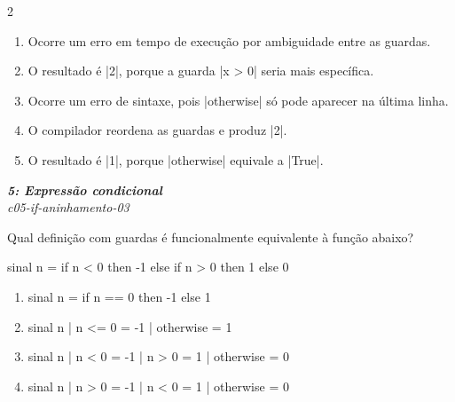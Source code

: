 \documentclass[a4paper,10pt,brazil]{article}
\begin{document}
\begin{multicols}{2}
\begin{enumerate}
  \item Ocorre um erro em tempo de execução por ambiguidade entre as guardas.

  \item O resultado é \haskellinline|2|, porque a guarda \haskellinline|x > 0| seria mais específica.

  \item Ocorre um erro de sintaxe, pois \haskellinline|otherwise| só pode aparecer na última linha.

  \item O compilador reordena as guardas e produz \haskellinline|2|.

  \item O resultado é \haskellinline|1|, porque \haskellinline|otherwise| equivale a \haskellinline|True|.


\end{enumerate}

\begin{flushright}
  \footnotesize
  \textit{\textbf{5: Expressão condicional}}\\
  \textit{c05-if-aninhamento-03}\\

\end{flushright}
Qual definição com guardas é funcionalmente equivalente à função abaixo?
\begin{haskellcode}
sinal n = if n < 0 then -1 else if n > 0 then 1 else 0
\end{haskellcode}

\begin{enumerate}
  \item \begin{haskellcode}
sinal n = if n == 0 then -1 else 1
\end{haskellcode}

  \item \begin{haskellcode}
sinal n
  | n <= 0    = -1
  | otherwise = 1
\end{haskellcode}

  \item \begin{haskellcode}
sinal n
  | n < 0     = -1
  | n > 0     = 1
  | otherwise = 0
\end{haskellcode}

  \item \begin{haskellcode}
sinal n
  | n > 0     = -1
  | n < 0     = 1
  | otherwise = 0
\end{haskellcode}


\end{enumerate}
\end{multicols}
\end{document}
